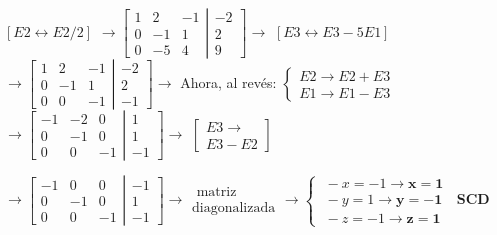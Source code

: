 \begin{proofw}
 \noindent \textcolor{gris}{$[E2 \leftrightarrow E2/2 ] $}
 $ \to \left[ \begin{matrix}
  1 & 2 & -1 \\ 0 & -1 & 1 \\ 0 & -5 & 4 
 \end{matrix}\right. 
 \left| \begin{matrix}
  -2 \\ 2 \\ 9  
 \end{matrix}\right] \to$
  \noindent \textcolor{gris}{$[E3 \leftrightarrow E3-5E1 ] $}
  $ \to \left[ \begin{matrix}
  1 & \boxed{2} & \boxed{-1} \\ 0 & -1 & \boxed{1} \\ 0 & 0 & -1 
 \end{matrix}\right. 
 \left| \begin{matrix}
  -2 \\ 2 \\ -1  
 \end{matrix}\right] \to$
  \textcolor{gris}{Ahora, al revés: $\begin{cases}E2 \to E2+E3 \\ E1 \to E1-E3 \end{cases} $}
   $ \to \left[ \begin{matrix}
  -1 & \boxed{-2} & 0 \\ 0 & -1 & 0 \\ 0 & 0 & -1 
 \end{matrix}\right. 
 \left| \begin{matrix}
  1 \\ 1 \\ -1  
 \end{matrix}\right] \to$
 \textcolor{gris}{$\left[\begin{matrix}E3\to \\ E3-E2\end{matrix} \right]$}
 
 \noindent    $ \to \left[ \begin{matrix}
  -1 & 0 & 0 \\ 0 & -1 & 0 \\ 0 & 0 & -1 
 \end{matrix}\right. 
 \left| \begin{matrix}
  -1 \\ 1 \\ -1  
 \end{matrix}\right] \to \begin{matrix} \text{ matriz } \\ \text{diagonalizada}  \end{matrix} \to \begin{cases} \; -x=-1 \to \boldsymbol{x=1} \\ \; -y=1 \to \boldsymbol{y=-1} \\ \; -z=-1 \to \boldsymbol{z=1}   \end{cases}\; \; \boldsymbol{SCD}$
\end{proofw}

